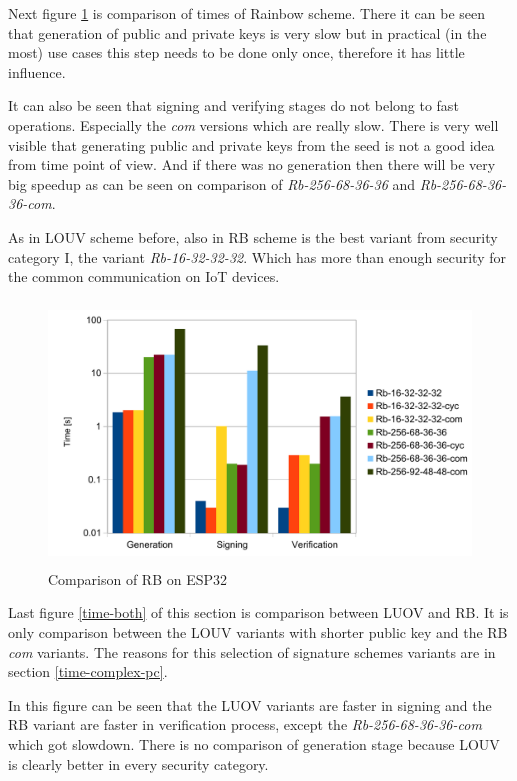 \documentclass[thesis=M,english]{FITthesis}[2019/12/23]
\begin{document}
Next figure \ref{time-rb} is comparison of times of Rainbow scheme. There it can be seen that generation of public and private keys is very slow but in practical (in the most) use cases this step needs to be done only once, therefore it has little influence.

\bigskip
\noindent
It can also be seen that signing and verifying stages do not belong to fast operations. Especially the \textit{com} versions which are really slow. There is very well visible that generating public and private keys from the seed is not a good idea from time point of view. And if there was no generation then there will be very big speedup as can be seen on comparison of \textit{Rb-256-68-36-36} and \textit{Rb-256-68-36-36-com}.

\bigskip
\noindent
As in LOUV scheme before, also in RB scheme is the best variant from security category I, the variant \textit{Rb-16-32-32-32}. Which has more than enough security for the common communication on IoT devices.

\begin{figure}[H]
\centering
\includegraphics[width=13cm,height=7cm]{images/time-rb.pdf}
\caption{Comparison of RB on ESP32}
\label{time-rb}
\end{figure}

\noindent
Last figure \ref{time-both} of this section is comparison between LUOV and RB. It is only comparison between the LOUV variants with shorter public key and the RB \textit{com} variants. The reasons for this selection of signature schemes variants are in section \ref{time-complex-pc}.

\bigskip
\noindent
In this figure can be seen that the LUOV variants are faster in signing and the RB variant are faster in verification process, except the \textit{Rb-256-68-36-36-com} which got slowdown. There is no comparison of generation stage because LOUV is clearly better in every security category.
\end{document}
